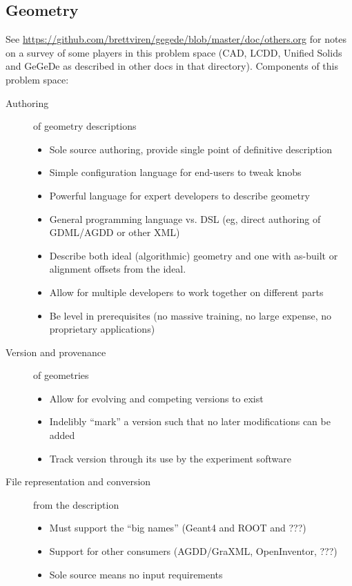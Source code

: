 \subsection{Geometry}

See
\url{https://github.com/brettviren/gegede/blob/master/doc/others.org}
for notes on a survey of some players in this problem space (CAD,
LCDD, Unified Solids and GeGeDe as described in other docs in that
directory).  Components of this problem space:

\begin{description}
\item[Authoring] of geometry descriptions
  \begin{itemize}
  \item Sole source authoring, provide single point of definitive description
  \item Simple configuration language for end-users to tweak knobs
  \item Powerful language for expert developers to describe geometry
  \item General programming language vs. DSL (eg, direct authoring of GDML/AGDD or other XML)
  \item Describe both ideal (algorithmic) geometry and one with as-built or alignment offsets from the ideal.
  \item Allow for multiple developers to work together on different parts
  \item Be level in prerequisites (no massive training, no large expense, no proprietary applications)
  \end{itemize}
\item[Version and provenance] of geometries
  \begin{itemize}
  \item Allow for evolving and competing versions to exist
  \item Indelibly ``mark'' a version such that no later modifications can be added
  \item Track version through its use by the experiment software
  \end{itemize}
\item[File representation and conversion] from the description
  \begin{itemize}
  \item Must support the ``big names'' (Geant4 and ROOT and ???)
  \item Support for other consumers (AGDD/GraXML, OpenInventor, ???)
  \item Sole source means no input requirements

\end{itemize}
\end{description}
